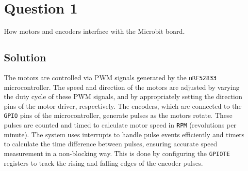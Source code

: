 \section*{Question 1}

How motors and encoders interface with the Microbit board.

\subsection*{Solution}

The motors are controlled via PWM signals generated by the \texttt{nRF52833} microcontroller.
The speed and direction of the motors are adjusted by varying the duty cycle of these PWM signals, and by appropriately setting the direction pins of the motor driver, respectively.
The encoders, which are connected to the \texttt{GPIO} pins of the microcontroller, generate pulses as the motors rotate.
These pulses are counted and timed to calculate motor speed in \texttt{RPM} (revolutions per minute).
The system uses interrupts to handle pulse events efficiently and timers to calculate the time difference between pulses, ensuring accurate speed measurement in a non-blocking way.
This is done by configuring the \texttt{GPIOTE} registers to track the rising and falling edges of the encoder pulses.
